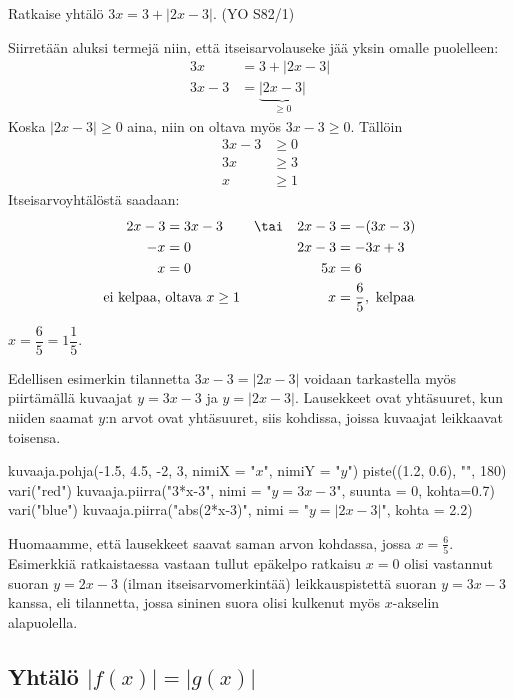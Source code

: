 \begin{esimerkki}
	Ratkaise yhtälö $3x=3+|2x-3|$. (YO S82/1)
	\begin{esimratk}
		Siirretään aluksi termejä niin, että itseisarvolauseke jää yksin omalle puolelleen:
		\begin{align*}
			3x & =3+|2x-3|  \\
			3x-3 & =\underbrace{|2x-3|}_{\geq 0}
		\end{align*}
		Koska $|2x-3|\geq0$ aina, niin on oltava myös $3x-3\geq0$. Tällöin
		\begin{align*}
			3x-3&\geq0 \\
			3x&\geq3 \\
			x&\geq1
		\end{align*}
		Itseisarvoyhtälöstä saadaan:
		\begin{align*}
			2x-3&=3x-3   & &\tai & 2x-3 & =-(3x-3) \\
			-x&=0        && & 2x-3&=-3x+3 \\
			x&=0         && & 5x&=6 \\
			\text{ei kelpaa, } & \text{oltava $x\geq1$}  && & x&=\frac{6}{5}, \text{ kelpaa}
		\end{align*}
	\end{esimratk}
	\begin{esimvast}
		$x=\dfrac{6}{5}=1\dfrac{1}{5}$.
	\end{esimvast}
\end{esimerkki}

Edellisen esimerkin tilannetta $3x-3=|2x-3|$ voidaan tarkastella myös piirtämällä kuvaajat $y=3x-3$ ja $y=|2x-3|$. Lausekkeet ovat yhtäsuuret, kun niiden saamat $y$:n arvot ovat yhtäsuuret, siis kohdissa, joissa kuvaajat leikkaavat toisensa.

\begin{kuva}
    kuvaaja.pohja(-1.5, 4.5, -2, 3, nimiX = "$x$", nimiY = "$y$")
    piste((1.2, 0.6), "", 180)
    vari("red")
    kuvaaja.piirra("3*x-3", nimi = "$y=3x - 3$", suunta = 0, kohta=0.7)
    vari("blue")
    kuvaaja.piirra("abs(2*x-3)", nimi = "$y=|2x - 3|$", kohta = 2.2)
\end{kuva}

Huomaamme, että lausekkeet saavat saman arvon kohdassa, jossa \mbox{$x=\frac{6}{5}$}. Esimerkkiä ratkaistaessa vastaan tullut epäkelpo ratkaisu $x=0$ olisi vastannut suoran $y=2x-3$ (ilman itseisarvomerkintää) leikkauspistettä suoran $y=3x-3$ kanssa, eli tilannetta, jossa sininen suora olisi kulkenut myös $x$-akselin alapuolella.

\subsection*{Yhtälö $|f(x)|=|g(x)|$}

